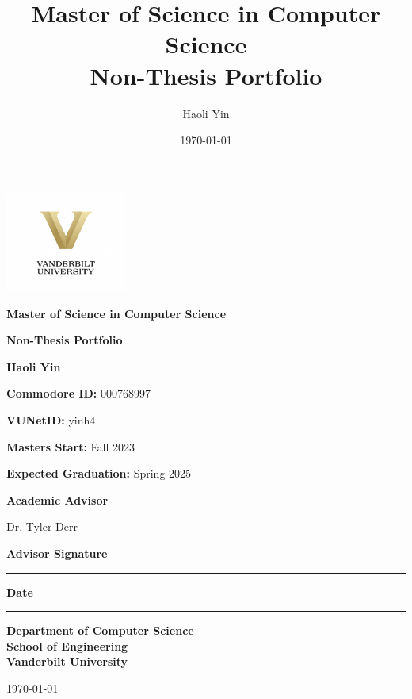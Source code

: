 \documentclass[12pt,letterpaper]{report}
\title{Master of Science in Computer Science\\Non-Thesis Portfolio}
\author{Haoli Yin}
\date{\today}
\begin{document}
\begin{titlepage}
    \centering
    \vspace*{0.5cm}
    {\includegraphics[width=0.3\textwidth]{vanderbilt_logo.pdf}\par}
    \vspace{0.7cm}
    {\LARGE\bfseries Master of Science in Computer Science\par}
    \vspace{0.5cm}
    {\LARGE\bfseries Non-Thesis Portfolio\par}
    \vspace{0.7cm}
    {\Large\textbf{Haoli Yin}\par}
    \vspace{0.2cm}
    {\normalsize\textbf{Commodore ID: }000768997\par}
    \vspace{0.2cm}
    {\normalsize\textbf{VUNetID: }yinh4\par}
    \vspace{0.2cm}
    {\normalsize\textbf{Masters Start:} Fall 2023\par}
    \vspace{0.2cm}
    {\normalsize\textbf{Expected Graduation:} Spring 2025\par}
    \vspace{0.7cm}
    {\normalsize\textbf{Academic Advisor}\par}
    \vspace{0.2cm}
    {\normalsize Dr. Tyler Derr\par}
    \vspace{0.7cm}
    {\normalsize\textbf{Advisor Signature}\par}
    \vspace{0.2cm}
    \begin{center}
        \rule{7cm}{0.4pt}
    \end{center}
    \vspace{0.4cm}
    {\normalsize\textbf{Date}\par}
    \vspace{0.2cm}
    \begin{center}
        \rule{7cm}{0.4pt}
    \end{center}
    \vspace{0.7cm}
    {\normalsize\textbf{Department of Computer Science}\\
    \textbf{School of Engineering}\\
    \textbf{Vanderbilt University}\par}
    \vspace{0.5cm}
    {\normalsize\today\par}
\end{titlepage}
\end{document}

